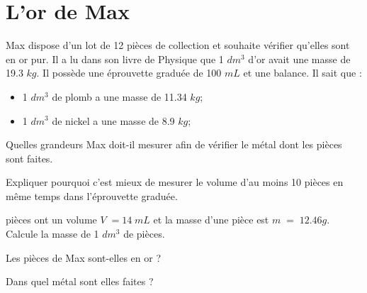 \section{L'or de Max}

Max dispose d'un lot de 12 pièces de collection et souhaite vérifier qu'elles sont en or pur. Il a lu dans son livre de Physique que 1 $dm^3$ d'or avait une masse de \num{19.3} $kg$. Il possède une éprouvette graduée de 100 $mL$ et une balance. Il sait que :

\begin{itemize}
	\item 1 $dm^3$ de plomb a une masse de \num{11.34} $kg$;
	\item 1 $dm^3$ de nickel a une masse de \num{8.9} $kg$;
\end{itemize} 
\begin{questions}
	\question[] Quelles grandeurs Max doit-il mesurer afin de vérifier le métal dont les pièces sont faites.
	\begin{solution}
		
	\end{solution}
	
	\question[] Expliquer pourquoi c'est mieux de mesurer le volume d'au moins 10 pièces en même temps dans l'éprouvette graduée.
	\begin{solution}
		
	\end{solution}
	
	 pièces ont un volume $V \;= 14\; mL$ et la masse d'une pièce est $m \; = \; \num{12,46} g$. Calcule la masse de 1 $dm^3$ de pièces.
	\begin{solution}
		
	\end{solution}


	\question[] Les pièces de Max sont-elles en or ?
	
	
	\question[] Dans quel métal sont elles faites ?
\end{questions}